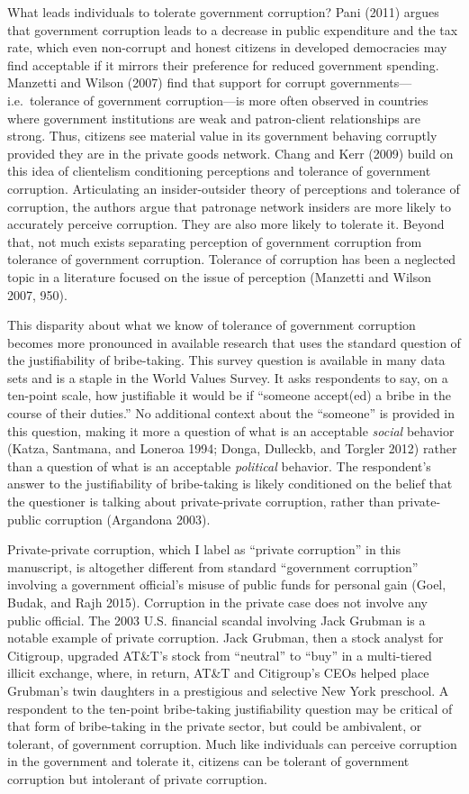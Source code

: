 \documentclass[11pt,]{article}
\begin{document}
What leads individuals to tolerate government corruption? Pani (2011)
argues that government corruption leads to a decrease in public
expenditure and the tax rate, which even non-corrupt and honest citizens
in developed democracies may find acceptable if it mirrors their
preference for reduced government spending. Manzetti and Wilson (2007)
find that support for corrupt governments---i.e.~tolerance of government
corruption---is more often observed in countries where government
institutions are weak and patron-client relationships are strong. Thus,
citizens see material value in its government behaving corruptly
provided they are in the private goods network. Chang and Kerr (2009)
build on this idea of clientelism conditioning perceptions and tolerance
of government corruption. Articulating an insider-outsider theory of
perceptions and tolerance of corruption, the authors argue that
patronage network insiders are more likely to accurately perceive
corruption. They are also more likely to tolerate it. Beyond that, not
much exists separating perception of government corruption from
tolerance of government corruption. Tolerance of corruption has been a
neglected topic in a literature focused on the issue of perception
(Manzetti and Wilson 2007, 950).

This disparity about what we know of tolerance of government corruption
becomes more pronounced in available research that uses the standard
question of the justifiability of bribe-taking. This survey question is
available in many data sets and is a staple in the World Values Survey.
It asks respondents to say, on a ten-point scale, how justifiable it
would be if ``someone accept(ed) a bribe in the course of their
duties.'' No additional context about the ``someone'' is provided in
this question, making it more a question of what is an acceptable
\emph{social} behavior (Katza, Santmana, and Loneroa 1994; Donga,
Dulleckb, and Torgler 2012) rather than a question of what is an
acceptable \emph{political} behavior. The respondent's answer to the
justifiability of bribe-taking is likely conditioned on the belief that
the questioner is talking about private-private corruption, rather than
private-public corruption (Argandona 2003).

Private-private corruption, which I label as ``private corruption'' in
this manuscript, is altogether different from standard ``government
corruption'' involving a government official's misuse of public funds
for personal gain (Goel, Budak, and Rajh 2015). Corruption in the
private case does not involve any public official. The 2003 U.S.
financial scandal involving Jack Grubman is a notable example of private
corruption. Jack Grubman, then a stock analyst for Citigroup, upgraded
AT\&T's stock from ``neutral'' to ``buy'' in a multi-tiered illicit
exchange, where, in return, AT\&T and Citigroup's CEOs helped place
Grubman's twin daughters in a prestigious and selective New York
preschool. A respondent to the ten-point bribe-taking justifiability
question may be critical of that form of bribe-taking in the private
sector, but could be ambivalent, or tolerant, of government corruption.
Much like individuals can perceive corruption in the government and
tolerate it, citizens can be tolerant of government corruption but
intolerant of private corruption.
\end{document}
